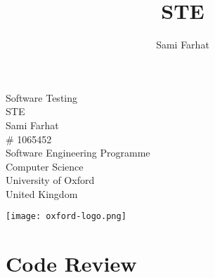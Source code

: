 \documentclass[11pt]{article}
\author{Sami Farhat}
\title{STE}
\begin{document}

\clearpage
\thispagestyle{empty} %
\pagebreak 
\begin{titlepage}
\begin{center}
\vspace*{1cm}
{\Huge Software Testing} \\
\vspace{0.5cm}
{\LARGE STE\\}
\vspace{0.5cm}
\vspace{3.5cm}
{\LARGE Sami Farhat\\}
\vspace{0.1cm}
{\Large \# 1065452\\}
\vspace{0.3cm}
\vfill
\vspace{0.8cm}
Software Engineering Programme\\        
Computer Science\\
\vspace{0.5cm}
University of Oxford\\
United Kingdom\\
\vspace{1.0cm}         

\texttt{[image: oxford-logo.png]}
\end{center}
\end{titlepage}


\clearpage
\tableofcontents 
\thispagestyle{empty} %
\pagebreak
{} %



\pagebreak
\section{Code Review}

\end{document}
